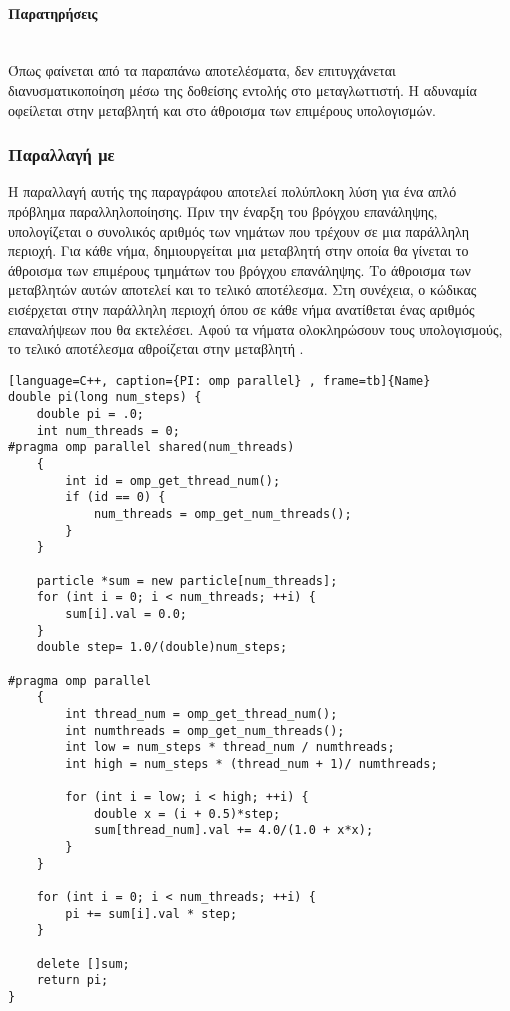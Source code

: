 \paragraph{Παρατηρήσεις}
\ \\
Όπως φαίνεται από τα παραπάνω αποτελέσματα, δεν επιτυγχάνεται διανυσματικοποίηση μέσω της δοθείσης εντολής στο μεταγλωττιστή. Η αδυναμία οφείλεται στην μεταβλητή \emph{} και στο άθροισμα των επιμέρους υπολογισμών.

\clearpage
\subsubsection{Παραλλαγή με }
Η παραλλαγή αυτής της παραγράφου αποτελεί πολύπλοκη λύση για ένα απλό πρόβλημα παραλληλοποίησης. Πριν την έναρξη του βρόγχου επανάληψης, υπολογίζεται ο συνολικός αριθμός των νημάτων που τρέχουν σε μια παράλληλη περιοχή. Για κάθε νήμα, δημιουργείται μια μεταβλητή  στην οποία θα γίνεται το άθροισμα των επιμέρους τμημάτων του βρόγχου επανάληψης. Το άθροισμα των μεταβλητών αυτών αποτελεί και το τελικό αποτέλεσμα. Στη συνέχεια, ο κώδικας εισέρχεται στην παράλληλη περιοχή όπου σε κάθε νήμα ανατίθεται ένας αριθμός επαναλήψεων που θα εκτελέσει. Αφού τα νήματα ολοκληρώσουν τους υπολογισμούς, το τελικό αποτέλεσμα αθροίζεται στην μεταβλητή .

\begin{spacing}{0.6}
\begin{lstlisting}[language=C++, caption={PI: omp parallel} , frame=tb]{Name}
double pi(long num_steps) {
    double pi = .0;
    int num_threads = 0;
#pragma omp parallel shared(num_threads)
    {
        int id = omp_get_thread_num();
        if (id == 0) {
            num_threads = omp_get_num_threads();
        }
    }
	
    particle *sum = new particle[num_threads];
    for (int i = 0; i < num_threads; ++i) {
        sum[i].val = 0.0;
    }
    double step= 1.0/(double)num_steps;

#pragma omp parallel
    {
        int thread_num = omp_get_thread_num();
        int numthreads = omp_get_num_threads();
        int low = num_steps * thread_num / numthreads;
        int high = num_steps * (thread_num + 1)/ numthreads;

        for (int i = low; i < high; ++i) {
            double x = (i + 0.5)*step;
            sum[thread_num].val += 4.0/(1.0 + x*x);
        }
    }
  
    for (int i = 0; i < num_threads; ++i) {
        pi += sum[i].val * step;
    }

    delete []sum;
    return pi;
}

\end{lstlisting}
\end{spacing}



